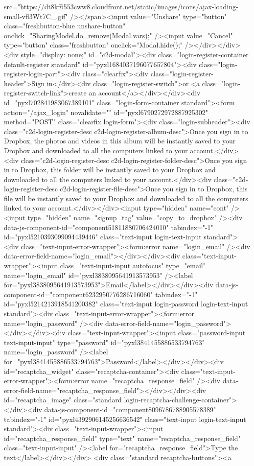 {src="https://dt8kf6553cww8.cloudfront.net/static/images/icons/ajax-loading-small-vfl3Wt7C_.gif" /></span><input value="Unshare" type="button" class="freshbutton-blue unshare-button" onclick="SharingModel.do_remove(Modal.vars);" /><input value="Cancel" type="button" class="freshbutton" onclick="Modal.hide();" /></div></div><div style="display: none;" id="c2d-modal"><div class="login-register-container default-register standard" id="pyxl1684037196077657804"><div class="login-register-login-part"><div class="clearfix"><div class="login-register-header">Sign in</div><div class="login-register-switch">or <a class="login-register-switch-link">create an account</a></div></div><div id="pyxl702841983067389101" class="login-form-container  standard"><form action="/ajax_login" novalidate="" id="pyxl6790272972887925302" method="POST" class="clearfix login-form"><div class="login-subheader"><div class="c2d-login-register-desc c2d-login-register-album-desc">Once you sign in to Dropbox, the photos and videos in this album will be instantly saved to your Dropbox and downloaded to all the computers linked to your account.</div><div class="c2d-login-register-desc c2d-login-register-folder-desc">Once you sign in to Dropbox, this folder will be instantly saved to your Dropbox and downloaded to all the computers linked to your account.</div><div class="c2d-login-register-desc c2d-login-register-file-desc">Once you sign in to Dropbox, this file will be instantly saved to your Dropbox and downloaded to all the computers linked to your account.</div></div><input type="hidden" name="cont" /><input type="hidden" name="signup_tag" value="copy_to_dropbox" /><div data-js-component-id="component51811880706424010" tabindex="-1" id="pyxl5210393099094439446" class="text-input login-text-input standard"><div class="text-input-error-wrapper"><form:error name="login_email" /><div data-error-field-name="login_email"></div></div><div class="text-input-wrapper"><input class="text-input-input autofocus" type="email" name="login_email" id="pyxl3838095641913573953" /><label for="pyxl3838095641913573953">Email</label></div></div><div data-js-component-id="component6232950776286716060" tabindex="-1" id="pyxl5214213918541200382" class="text-input login-password login-text-input standard"><div class="text-input-error-wrapper"><form:error name="login_password" /><div data-error-field-name="login_password"></div></div><div class="text-input-wrapper"><input class="password-input text-input-input" type="password" id="pyxl3841455886533794763" name="login_password" /><label for="pyxl3841455886533794763">Password</label></div></div><div id="recaptcha_widget" class="recaptcha-container"><div class="text-input-error-wrapper"><form:error name="recaptcha_response_field" /><div data-error-field-name="recaptcha_response_field"></div></div><div id="recaptcha_image" class="standard login-recaptcha-challenge-container"></div><div data-js-component-id="component8096786788905578389" tabindex="-1" id="pyxl4392906145256636542" class="text-input login-text-input standard"><div class="text-input-wrapper"><input id="recaptcha_response_field" type="text" name="recaptcha_response_field" class="text-input-input" /><label for="recaptcha_response_field">Type the text</label></div></div> <div class="standard recaptcha-buttons"><a }
